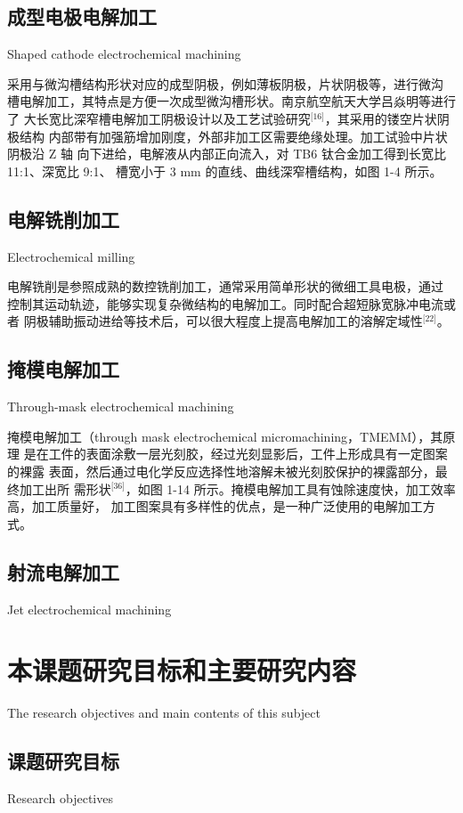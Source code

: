 \documentclass[
  type=doctor
]{../gdutthesis}
\begin{document}
\subsection{成型电极电解加工}{Shaped cathode electrochemical machining}

采用与微沟槽结构形状对应的成型阴极，例如薄板阴极，片状阴极等，进行微沟
槽电解加工，其特点是方便一次成型微沟槽形状。南京航空航天大学吕焱明等进行了
大长宽比深窄槽电解加工阴极设计以及工艺试验研究$^{\text{[16]}}$，其采用的镂空片状阴极结构
内部带有加强筋增加刚度，外部非加工区需要绝缘处理。加工试验中片状阴极沿 Z 轴
向下进给，电解液从内部正向流入，对 TB6 钛合金加工得到长宽比 11:1、深宽比 9:1、
槽宽小于 3 mm 的直线、曲线深窄槽结构，如图 1-4 所示。

\subsection{电解铣削加工}{Electrochemical milling}

电解铣削是参照成熟的数控铣削加工，通常采用简单形状的微细工具电极，通过
控制其运动轨迹，能够实现复杂微结构的电解加工。同时配合超短脉宽脉冲电流或者
阴极辅助振动进给等技术后，可以很大程度上提高电解加工的溶解定域性$^{\text{[22]}}$。

\subsection{掩模电解加工}{Through-mask electrochemical machining}

掩模电解加工（through mask electrochemical micromachining，TMEMM），其原理
是在工件的表面涂敷一层光刻胶，经过光刻显影后，工件上形成具有一定图案的裸露
表面，然后通过电化学反应选择性地溶解未被光刻胶保护的裸露部分，最终加工出所
需形状$^{\text{[36]}}$，如图 1-14 所示。掩模电解加工具有蚀除速度快，加工效率高，加工质量好，
加工图案具有多样性的优点，是一种广泛使用的电解加工方式。

\subsection{射流电解加工}{Jet electrochemical machining}

\section{本课题研究目标和主要研究内容}{The research objectives and main contents of this subject}

\subsection{课题研究目标}{Research objectives}
\end{document}
